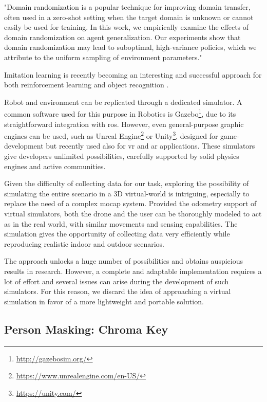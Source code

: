 "Domain randomization is a popular technique for improving domain transfer, often used in a zero-shot setting when the target domain is unknown or cannot easily be used for training. In this work, we empirically examine the effects of domain randomization on agent generalization. Our experiments show that domain randomization may lead to suboptimal, high-variance policies, which we attribute to the uniform sampling of environment parameters."

\medskip

Imitation learning is recently becoming an interesting and successful approach for both reinforcement learning \cite{imitation_learning_3d_navigation} and object recognition \cite{tobin2017domain} \cite{weng2019DR}.

Robot and environment can be replicated through a dedicated simulator. A common software used for this purpose in Robotics is  Gazebo\footnote{\url{http://gazebosim.org/}}, due to its straightforward integration with \gls{ros}. However, even general-purpose graphic engines can be used, such as Unreal Engine\footnote{\url{https://www.unrealengine.com/en-US/}} or Unity\footnote{\url{https://unity.com/}}, designed for game-development but recently used also for \gls{vr} and \gls{ar} applications. These simulators give developers unlimited possibilities, carefully supported by solid physics engines and active communities.

\medskip

Given the difficulty of collecting data for our task, exploring the possibility of simulating the entire scenario in a 3D virtual-world is intriguing, especially to replace the need of a complex \gls{mocap} system. Provided the odometry support of virtual simulators, both the drone and the user can be thoroughly modeled to act as in the real world, with similar movements and sensing capabilities. The simulation gives the opportunity of collecting data very efficiently while reproducing realistic indoor and outdoor scenarios.

The approach unlocks a huge number of possibilities and obtains auspicious results in research. However, a complete and adaptable implementation requires a lot of effort and several issues can arise during the development of such simulators. For this reason, we discard the idea of approaching a virtual simulation in favor of a more lightweight and portable solution.



\subsection{Person Masking: Chroma Key}

